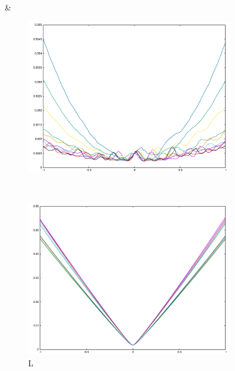 {\begin{figure}[H]
\begin{subfigure}{.33\textwidth}
\end{subfigure}&
\begin{subfigure}{.33\textwidth}
	\includegraphics[width=\linewidth]{fig/ajherr/t/S_chi.pdf}
\end{subfigure}\\
\begin{subfigure}{.33\textwidth}
	\includegraphics[width=\linewidth]{fig/ajherr/t/L_mae.pdf}
	\caption{L}
\end{subfigure}%
\begin{subfigure}{.33\textwidth}

\end{subfigure}
\end{figure}}
